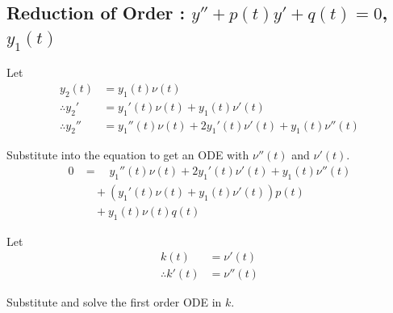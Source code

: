 \documentclass[fleqn, a4paper, 12pt, twoside]{article}
\theoremstyle{definition}
\theoremstyle{theorem}
\begin{document}
\subsection{Reduction of Order : $y'' + p(t) y' + q(t) = 0$, $y_1(t)$}

\begin{algorithmic}[1]
	\item
		Let
		\begin{align*}
			y_2(t) &= y_1(t) \nu(t)\\
			\therefore {y_2}' &= {y_1}'(t) \nu(t) + y_1(t) \nu'(t)\\
			\therefore {y_2}'' &= {y_1}''(t) \nu(t) + 2 {y_1}'(t) \nu'(t) + y_1(t) \nu''(t)
		\end{align*}
	\item
		Substitute into the equation to get an ODE with $\nu''(t)$ and $\nu'(t)$.
		\begin{align*}
			0 &= \quad {y_1}''(t) \nu(t) + 2 {y_1}'(t) \nu'(t) + y_1(t) \nu''(t)\\
			&\quad + \left( {y_1}'(t) \nu(t) + y_1(t) \nu'(t) \right) p(t)\\
			&\quad + y_1(t) \nu(t) q(t)
		\end{align*}
	\item
		Let
		\begin{align*}
			k(t) &= \nu'(t)\\
			\therefore k'(t) &= \nu''(t)
		\end{align*}
	\item
       	Substitute and solve the first order ODE in $k$.
\end{algorithmic}

\end{document}
